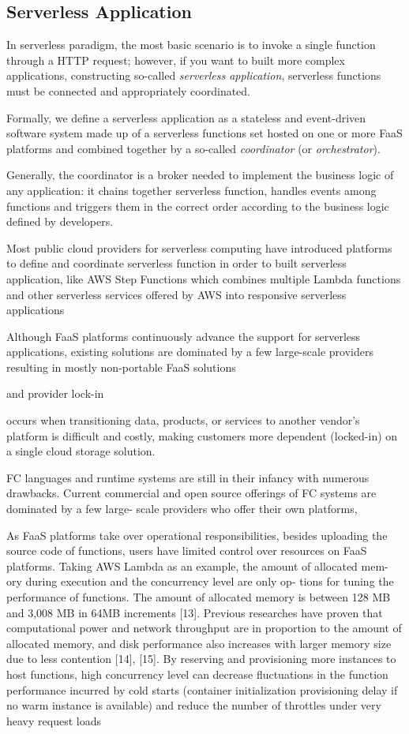 \documentclass[12pt,a4paper]{report}
\theoremstyle{definition}
\begin{document}
\subsection{Serverless Application}

In serverless paradigm, the most basic scenario is to invoke a single function through a HTTP request; however, if you want to built more complex applications, constructing so-called \textit{serverless application}, serverless functions must be connected and appropriately coordinated.

Formally, we define a serverless application as a stateless and event-driven software system made up of a serverless functions set hosted on one or more FaaS platforms and combined together by a so-called \textit{coordinator} (or \textit{orchestrator}).

Generally, the coordinator is a broker needed to implement the business logic of any application: it chains together serverless function, handles events among functions and triggers them in the correct order according to the business logic defined by developers. 

Most public cloud providers for serverless computing have introduced platforms to define and coordinate serverless function in order to built serverless application, like AWS Step Functions which combines multiple Lambda functions and other serverless services offered by AWS into responsive serverless applications

Although FaaS platforms continuously advance the support for serverless applications, existing solutions are dominated by a few large-scale providers resulting in mostly non-portable FaaS solutions 

and provider lock-in

occurs when transitioning data, products, or services to another vendor's platform is difficult and costly, making customers more dependent (locked-in) on a single cloud storage solution.

FC languages and runtime systems are still in their
infancy with numerous drawbacks. Current commercial and open
source offerings of FC systems are dominated by a few large-
scale providers who offer their own platforms, 

As FaaS platforms take over operational responsibilities,
besides uploading the source code of functions, users have
limited control over resources on FaaS platforms. Taking
AWS Lambda as an example, the amount of allocated mem-
ory during execution and the concurrency level are only op-
tions for tuning the performance of functions. The amount
of allocated memory is between 128 MB and 3,008 MB
in 64MB increments [13]. Previous researches have proven
that computational power and network throughput are in
proportion to the amount of allocated memory, and disk
performance also increases with larger memory size due
to less contention [14], [15]. By reserving and provisioning
more instances to host functions, high concurrency level can
decrease ﬂuctuations in the function performance incurred
by cold starts (container initialization provisioning delay if
no warm instance is available) and reduce the number of
throttles under very heavy request loads
\end{document}
